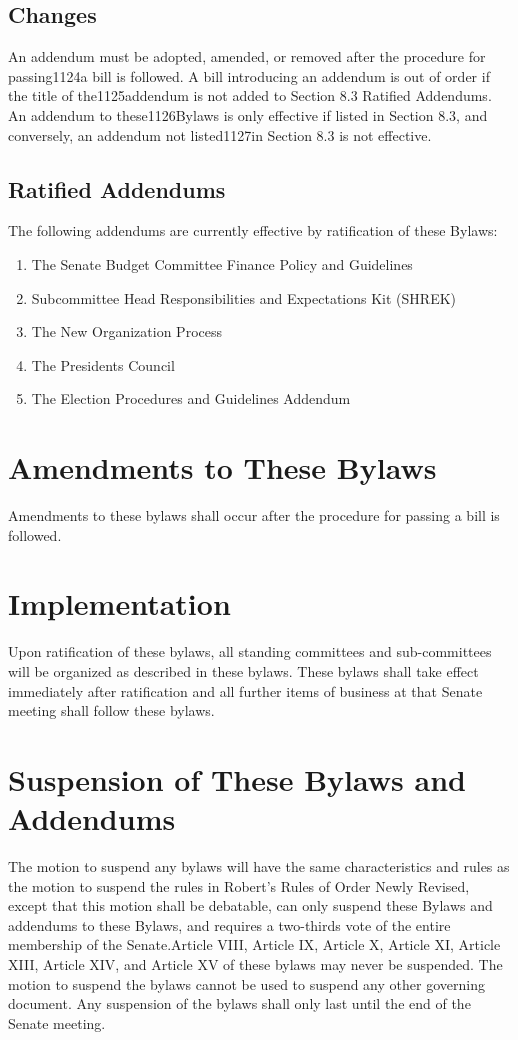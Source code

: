 \documentclass[12pt]{scrreprt}
\begin{document}
\section{Changes}
An addendum must be adopted, amended, or removed after the procedure for passing1124a  bill  is  followed.   A  bill  introducing  an  addendum  is  out  of  order  if  the  title  of  the1125addendum  is  not  added  to  Section  8.3  Ratified  Addendums.   An  addendum  to  these1126Bylaws is only effective if listed in Section 8.3, and conversely, an addendum not listed1127in Section 8.3 is not effective.

\section{Ratified Addendums}
The following addendums are currently effective by ratification of these Bylaws:
\begin{enumerate}
    \item The Senate Budget Committee Finance Policy and Guidelines
    \item  Subcommittee Head Responsibilities and Expectations Kit (SHREK)
    \item The New Organization Process 
    \item  The Presidents Council
    \item The Election Procedures and Guidelines Addendum
\end{enumerate}


\chapter{Amendments to These Bylaws} \label{sec:amendments}
Amendments to these bylaws shall occur after the procedure for passing a bill 
is followed. 

\chapter{Implementation}
Upon ratification of these bylaws, all standing committees and sub-committees 
will be organized as described in these bylaws. These bylaws shall take effect 
immediately after ratification and all further items of business at that 
Senate meeting shall follow these bylaws. 

\chapter{Suspension of These Bylaws and Addendums} \label{sec:suspension}
The motion to suspend any bylaws will have the same characteristics and rules as the motion to
suspend the rules in Robert’s Rules of Order Newly Revised, except that this motion shall be
debatable, can only suspend these Bylaws and addendums to these Bylaws, and requires a two-thirds
vote of the entire membership of the Senate.Article VIII, Article IX, Article X, Article XI, Article XIII, Article XIV, and
Article XV of these bylaws may never be suspended. The motion to suspend the bylaws cannot be
used to suspend any other governing document. Any suspension of the bylaws shall only last until
the end of the Senate meeting. 
\end{document}
